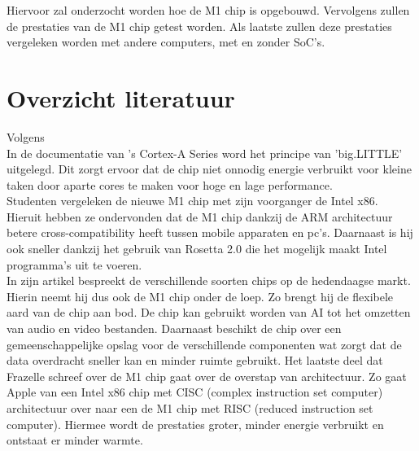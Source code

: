 \documentclass{hogent-article}
\begin{document}
Hiervoor zal onderzocht worden hoe de M1 chip is opgebouwd. Vervolgens zullen de prestaties van de M1 chip getest worden. Als laatste zullen deze prestaties vergeleken worden met andere computers, met en zonder SoC's.



\section{Overzicht literatuur}



Volgens \textcite{Apple2020}  \\
In de documentatie van \textcite{ARM2014}'s Cortex-A Series word het principe van 'big.LITTLE' uitgelegd. Dit zorgt ervoor dat de chip niet onnodig energie verbruikt voor kleine taken door aparte cores te maken voor hoge en lage performance. \\
Studenten \textcite{Dalakoti2022} vergeleken de nieuwe M1 chip met zijn voorganger de Intel x86. Hieruit hebben ze ondervonden dat de M1 chip dankzij de ARM architectuur betere cross-compatibility heeft tussen mobile apparaten en pc's. Daarnaast is hij ook sneller dankzij het gebruik van Rosetta 2.0 die het mogelijk maakt Intel programma's uit te voeren. \\
In zijn artikel bespreekt \textcite{Frazelle2021} de verschillende soorten chips op de hedendaagse markt. Hierin neemt hij dus ook de M1 chip onder de loep. Zo brengt hij de flexibele aard van de chip aan bod. De chip kan gebruikt worden van AI tot het omzetten van audio en video bestanden. Daarnaast beschikt de chip over een gemeenschappelijke opslag voor de verschillende componenten wat zorgt dat de data overdracht sneller kan en minder ruimte gebruikt. Het laatste deel dat Frazelle schreef over de M1 chip gaat over de overstap van architectuur. Zo gaat Apple van een Intel x86 chip met CISC (complex instruction set computer) architectuur over naar een de M1 chip met RISC (reduced instruction set computer). Hiermee wordt de prestaties groter, minder energie verbruikt en ontstaat er minder warmte. \\
\end{document}
